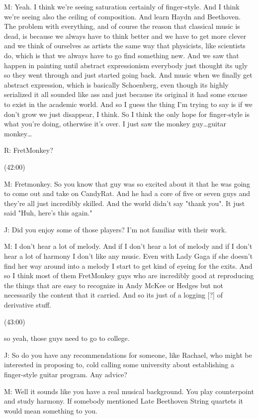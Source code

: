 \documentclass[11pt]{article}
\begin{document}
M: Yeah. I think we're seeing saturation certainly of finger-style. And I think we're seeing also the ceiling of composition. And learn Haydn and Beethoven. The problem with everything, and of course the reason that classical music is dead, is because we always have to think better and we have to get more clever and we think of ourselves as artists the same way that physicists, like scientists do, which is that we always have to go find something new. And we saw that happen in painting until abstract expressionism everybody just thought its ugly so they went through and just started going back. And music when we finally get abstract expression, which is basically Schoenberg, even though its highly serialized it all sounded like ass and just because its original it had some excuse to exist in the academic world. And so I guess the thing I'm trying to say is if we don't grow we just disappear, I think. So I think the only hope for finger-style is what you're doing, otherwise it's over. I just saw the monkey guy\ldots{}guitar monkey\ldots{}

R: FretMonkey?

(42:00)

M: Fretmonkey. So you know that guy was so excited about it that he was going to come out and take on CandyRat. And he had a core of five or seven guys and they're all just incredibly skilled. And the world didn't say "thank you". It just said "Huh, here's this again." 

J: Did you enjoy some of those players? I'm not familiar with their work.

M: I don't hear a lot of melody. And if I don't hear a lot of melody and if I don't hear a lot of harmony I don't like any music. Even with Lady Gaga if she doesn't find her way around into a melody I start to get kind of eyeing for the exits. And so I think most of them FretMonkey guys who are incredibly good at reproducing the things that are easy to recognize in Andy McKee or Hedges but not necessarily the content that it carried. And so its just of a logging [?] of derivative stuff.   

(43:00)

so yeah, those guys need to go to college.

J: So do you have any recommendations for someone, like Rachael, who might be interested in proposing to, cold calling some university about establishing a finger-style guitar program. Any advice?

M: Well it sounds like you have a real musical background. You play counterpoint and study harmony. If somebody mentioned Late Beethoven String quartets it would mean something to you.
\end{document}
